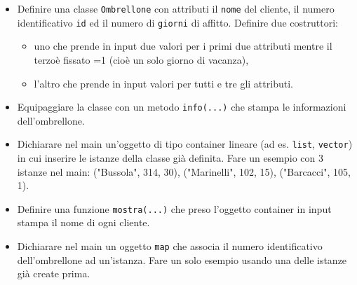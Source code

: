 \documentclass{article}
\begin{document}
\begin{itemize}
\item Definire una classe \texttt{Ombrellone} con attributi il \texttt{nome} del cliente, il numero identificativo \texttt{id} ed il numero di \texttt{giorni} di affitto. Definire due costruttori:
\begin{itemize}
	\item uno che prende in input due valori per i primi due attributi mentre il terzo\`e fissato =1 (cio\`e un solo giorno di vacanza),
	\item l'altro che prende in input valori per tutti e tre gli attributi.
	\end{itemize}
\item Equipaggiare la classe con un metodo \texttt{info(...)} che stampa le informazioni dell'ombrellone.
\item Dichiarare nel main un'oggetto di tipo container lineare (ad es. \texttt{list}, \texttt{vector}) in cui inserire le istanze della classe gi\`a definita. Fare un esempio con 3 istanze nel main: ("Bussola", 314, 30), ("Marinelli", 102, 15), ("Barcacci", 105, 1).
\item Definire una funzione \texttt{mostra(...)} che preso l'oggetto container in input stampa il nome di ogni cliente.
\item Dichiarare nel main un oggetto \texttt{map} che associa il numero identificativo dell'ombrellone ad un'istanza. Fare un solo esempio usando una delle istanze gi\`a create prima.
\end{itemize}
\end{document}
